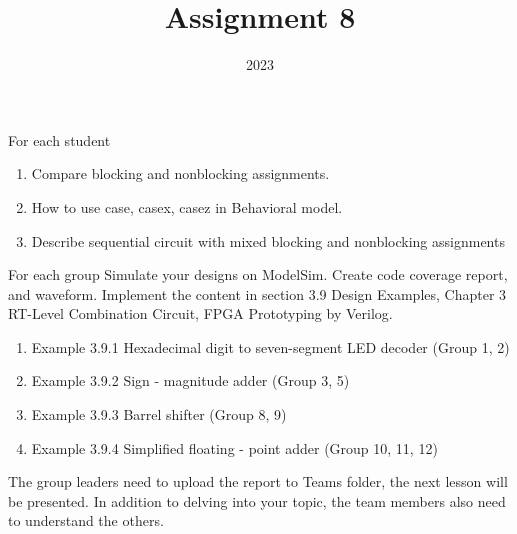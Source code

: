 \documentclass{vhdl-assignment}
\title{Assignment 8}
\date{2023}
\begin{document}
\maketitle
\thispagestyle{fancy}

\begin{problem}{For each student}
    \begin{enumerate}
        \item Compare blocking and nonblocking assignments.
        \item How to use case, casex, casez in Behavioral model.
        \item Describe sequential circuit with mixed blocking and nonblocking assignments
    \end{enumerate}

\end{problem}

\begin{problem}{For each group}
    Simulate your designs on ModelSim.
    Create code coverage report, and waveform.
    Implement the content in section 3.9 Design Examples, Chapter 3 RT-Level Combination Circuit, FPGA Prototyping by Verilog.
    
    \begin{enumerate}
        \item Example 3.9.1 Hexadecimal digit to seven-segment LED decoder (Group 1, 2)
        \item Example 3.9.2 Sign - magnitude adder (Group 3, 5)
        \item Example 3.9.3 Barrel shifter (Group 8, 9)
        \item Example 3.9.4 Simplified floating - point adder (Group 10, 11, 12)
    \end{enumerate}

    The group leaders need to upload the report to Teams folder, the next lesson will be presented.
    In addition to delving into your topic, the team members also need to understand the others.
\end{problem}
\end{document}
